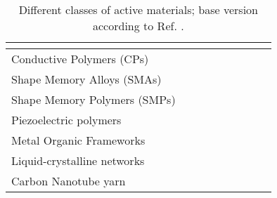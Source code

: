 \documentclass{article}
\begin{document}
\begin{landscape}
\begin{table}[htbp]
\begin{tabular}{|p{3.4cm}|p{1.5cm}|p{1.5cm}|p{1.5cm}|p{1.5cm}|p{1.5cm}|p{1.5cm}|p{1.5cm}|p{1.5cm}|}
			&  \cellcolor{myLightGray} \cite{Maehlich2023jimss,Li2019,Zari2024,Suzuki1990,Kim2010,Truong2018,Sumaru2006}
			&  \cellcolor{myLightGray} \cite{Leichsenring2017,EsserKahn2008,Li2005} 
			&  \cellcolor{myLightGray} \cite{Pu2024,Herrmann2021,Pedrosa2011,Nishat2022,Kim2013,Murakami2005,Erfkamp2019,Miyata2002,Nguyen2018,Gaziano2024} %
			&  \cellcolor{myLightGray} \cite{Yan2018,Kroh2018,Soppimath2001,Zhang2012,Krause2016,MacKenna2015,ManaviTehrani2010} %
			&  \cellcolor{myLightGray} \cite{Bellmann2015,Luo2023,Lv2018,Tellis2011} \\
			\hline
			Conductive Polymers (CPs)
			& 
			& \cellcolor{myLightGray} \cite{Otero1998,Otero2012,He2014,Baughman1996,Madden2002,Smela1993}
			& 
			&  
			&  
			&  
			&  
			&  \\
			\hline
			Shape Memory Alloys (SMAs)
			& \cellcolor{myLightGray} \cite{Wang2017,Sofla2008,Tadaki1988,Jani2014,Seelecke2004,Sun2012}
			& 
			& \cite{Faran2015}
			& \cite{Herath2020} %
			& 
			&  
			&  
			&  \\
			\hline
			Shape Memory Polymers (SMPs)
			& \cellcolor{myLightGray} \cite{Luo2024,Jang2021,Wang2022}
			& 
			& 
			&  
			&  
			&  
			&  
			& \cite{Venkatesan2019,Chen2009}  \\
			\hline
					\raggedright Piezoelectric polymers
			& \cellcolor{myLightGray}  \cite{Liu2007}
			& 
			& 
			& 
			& 
			&  
			&  
			& \\
			\hline
			\raggedright Metal Organic Frameworks
			& 
			& 
			& 
			& 
			& \cellcolor{myLightGray}  \cite{Krause2016a}
			&  
			&  
			& \cite{Li2024} \\
			\hline
			\raggedright Liquid-crystalline networks
			& \cite{Rousseau2003,Thomsen2001,Ware2015}
			& \cite{Lehmann2001,Huang2003}
			& \cite{Feng2023}
			& \cellcolor{myLightGray}  \cite{Lu2018,DaCunha2019,Lan2020,Yang2006}
			& 
			&  
			&  \cite{Cho2006}
			& \cite{Hu2020,Cho2006} \\
			\hline
			\raggedright Carbon Nanotube yarn
			& 
			& \cite{Lima2012}
			& 
			& \cite{Lima2012}
			& \cite{Lima2012}
			& 
			&  
			&  \\
			\hline
		\end{tabular}
		\caption{Different classes of active materials; base version according to Ref. \cite{Ehrenhofer2024shapes_review}.}
		\label{tab:active_materials}
	\end{table}
\end{landscape}
	

\clearpage
\end{document}
